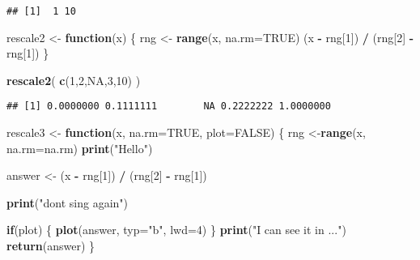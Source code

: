 \documentclass[
]{article}
\newenvironment{Shaded}{\begin{snugshade}}{\end{snugshade}}
\newcommand{\ControlFlowTok}[1]{\textcolor[rgb]{0.13,0.29,0.53}{\textbf{#1}}}
\newcommand{\DataTypeTok}[1]{\textcolor[rgb]{0.13,0.29,0.53}{#1}}
\newcommand{\DecValTok}[1]{\textcolor[rgb]{0.00,0.00,0.81}{#1}}
\newcommand{\KeywordTok}[1]{\textcolor[rgb]{0.13,0.29,0.53}{\textbf{#1}}}
\newcommand{\NormalTok}[1]{#1}
\newcommand{\OperatorTok}[1]{\textcolor[rgb]{0.81,0.36,0.00}{\textbf{#1}}}
\newcommand{\OtherTok}[1]{\textcolor[rgb]{0.56,0.35,0.01}{#1}}
\newcommand{\StringTok}[1]{\textcolor[rgb]{0.31,0.60,0.02}{#1}}
\begin{document}
\begin{verbatim}
## [1]  1 10
\end{verbatim}

\begin{Shaded}
\begin{Highlighting}[]
\NormalTok{rescale2 <-}\StringTok{ }\ControlFlowTok{function}\NormalTok{(x) \{}
\NormalTok{ rng <-}\StringTok{ }\KeywordTok{range}\NormalTok{(x, }\DataTypeTok{na.rm=}\OtherTok{TRUE}\NormalTok{)}
\NormalTok{ (x }\OperatorTok{-}\StringTok{ }\NormalTok{rng[}\DecValTok{1}\NormalTok{]) }\OperatorTok{/}\StringTok{ }\NormalTok{(rng[}\DecValTok{2}\NormalTok{] }\OperatorTok{-}\StringTok{ }\NormalTok{rng[}\DecValTok{1}\NormalTok{])}
\NormalTok{\}}
\end{Highlighting}
\end{Shaded}

\begin{Shaded}
\begin{Highlighting}[]
\KeywordTok{rescale2}\NormalTok{( }\KeywordTok{c}\NormalTok{(}\DecValTok{1}\NormalTok{,}\DecValTok{2}\NormalTok{,}\OtherTok{NA}\NormalTok{,}\DecValTok{3}\NormalTok{,}\DecValTok{10}\NormalTok{) )}
\end{Highlighting}
\end{Shaded}

\begin{verbatim}
## [1] 0.0000000 0.1111111        NA 0.2222222 1.0000000
\end{verbatim}

\begin{Shaded}
\begin{Highlighting}[]
\NormalTok{rescale3 <-}\StringTok{ }\ControlFlowTok{function}\NormalTok{(x, }\DataTypeTok{na.rm=}\OtherTok{TRUE}\NormalTok{, }\DataTypeTok{plot=}\OtherTok{FALSE}\NormalTok{) \{}
\NormalTok{ rng <-}\KeywordTok{range}\NormalTok{(x, }\DataTypeTok{na.rm=}\NormalTok{na.rm)}
 \KeywordTok{print}\NormalTok{(}\StringTok{"Hello"}\NormalTok{)}
 
\NormalTok{ answer <-}\StringTok{ }\NormalTok{(x }\OperatorTok{-}\StringTok{ }\NormalTok{rng[}\DecValTok{1}\NormalTok{]) }\OperatorTok{/}\StringTok{ }\NormalTok{(rng[}\DecValTok{2}\NormalTok{] }\OperatorTok{-}\StringTok{ }\NormalTok{rng[}\DecValTok{1}\NormalTok{])}
 
 \KeywordTok{print}\NormalTok{(}\StringTok{"dont sing again"}\NormalTok{)}
 
 \ControlFlowTok{if}\NormalTok{(plot) \{}
 \KeywordTok{plot}\NormalTok{(answer, }\DataTypeTok{typ=}\StringTok{"b"}\NormalTok{, }\DataTypeTok{lwd=}\DecValTok{4}\NormalTok{)}
\NormalTok{ \}}
 \KeywordTok{print}\NormalTok{(}\StringTok{"I can see it in ..."}\NormalTok{)}
 \KeywordTok{return}\NormalTok{(answer)}
\NormalTok{\}}
\end{Highlighting}
\end{Shaded}
\end{document}
